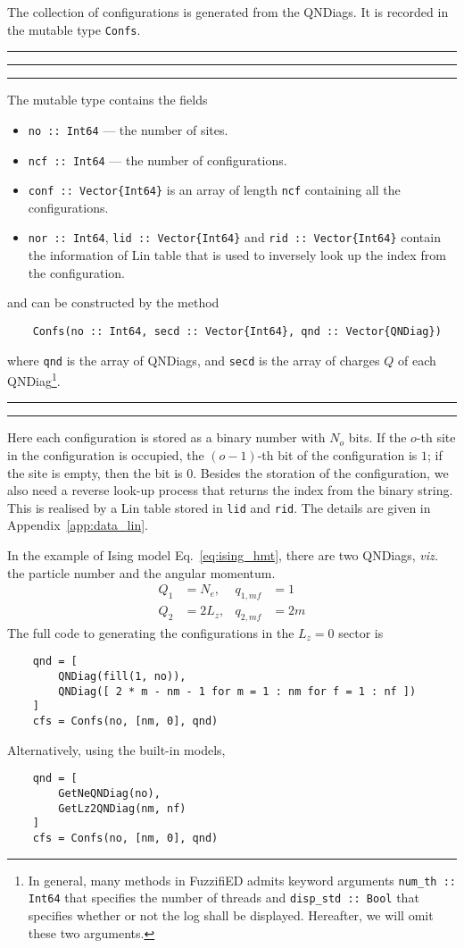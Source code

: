\documentclass{timesjhep}
\newenvironment{block}[1]{\vspace{0.4\baselineskip}\hrule\vspace{0.10\baselineskip}\hrule\vspace{0.30\baselineskip}{\bfseries #1}\vspace{0.2\baselineskip}\hrule\vspace{0.3\baselineskip}
}{\vspace{0.2\baselineskip}\hrule\vspace{0.10\baselineskip}\hrule\vspace{0.5\baselineskip}}
\begin{document}
The collection of configurations is generated from the QNDiags. It is recorded in the mutable type \lstinline|Confs|. 

\begin{block}{\lstinline|Confs| --- Type}
The mutable type contains the fields
\begin{itemize}
    \item \lstinline|no :: Int64| --- the number of sites.
    \item \lstinline|ncf :: Int64| --- the number of configurations.
    \item \lstinline|conf :: Vector{Int64}| is an array of length \lstinline|ncf| containing all the configurations. 
    \item \lstinline|nor :: Int64|, \lstinline|lid :: Vector{Int64}| and \lstinline|rid :: Vector{Int64}| contain the information of Lin table that is used to inversely look up the index from the configuration. 
\end{itemize}
and can be constructed by the method 
\begin{lstlisting}
    Confs(no :: Int64, secd :: Vector{Int64}, qnd :: Vector{QNDiag})
\end{lstlisting}
where \lstinline|qnd| is the array of QNDiags, and \lstinline|secd| is the array of charges $Q$ of each QNDiag\footnote{In general, many methods in FuzzifiED admits keyword arguments \lstinline[basicstyle=\ttfamily\scriptsize]|num_th :: Int64| that specifies the number of threads and \lstinline[basicstyle=\ttfamily\scriptsize]|disp_std :: Bool| that specifies whether or not the log shall be displayed. Hereafter, we will omit these two arguments.}.
\end{block}

Here each configuration is stored as a binary number with $N_o$ bits. If the $o$-th site in the configuration is occupied, the $(o-1)$-th bit of the configuration is $1$; if the site is empty, then the bit is $0$. Besides the storation of the configuration, we also need a reverse look-up process that returns the index from the binary string. This is realised by a Lin table stored in \lstinline|lid| and \lstinline|rid|. The details are given in Appendix~\ref{app:data_lin}. 

In the example of Ising model Eq.~\eqref{eq:ising_hmt}, there are two QNDiags, \textit{viz.} the particle number and the angular momentum. 
\begin{align}
    Q_1&=N_e,& q_{1,mf}&=1\nonumber\\
    Q_2&=2L_z,&q_{2,mf}&=2m
\end{align}
The full code to generating the configurations in the $L_z=0$ sector is 
\begin{lstlisting}
    qnd = [ 
        QNDiag(fill(1, no)), 
        QNDiag([ 2 * m - nm - 1 for m = 1 : nm for f = 1 : nf ])
    ]
    cfs = Confs(no, [nm, 0], qnd)
\end{lstlisting}
Alternatively, using the built-in models, 
\begin{lstlisting}
    qnd = [ 
        GetNeQNDiag(no), 
        GetLz2QNDiag(nm, nf) 
    ]
    cfs = Confs(no, [nm, 0], qnd)
\end{lstlisting}
\end{document}
